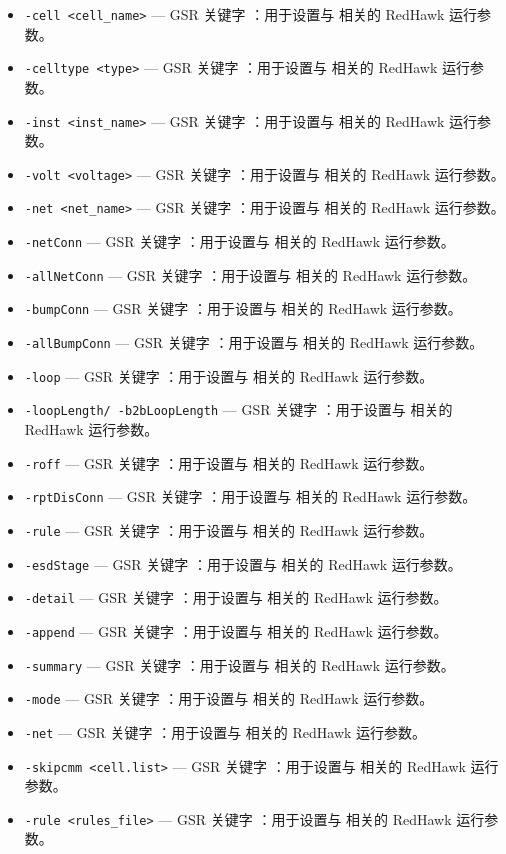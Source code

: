 \begin{itemize}
\item \texttt{-cell <cell\_name>} — GSR 关键字 ：用于设置与  相关的 RedHawk 运行参数。
\item \texttt{-celltype <type>} — GSR 关键字 ：用于设置与  相关的 RedHawk 运行参数。
\item \texttt{-inst <inst\_name>} — GSR 关键字 ：用于设置与  相关的 RedHawk 运行参数。
\item \texttt{-volt <voltage>} — GSR 关键字 ：用于设置与  相关的 RedHawk 运行参数。
\item \texttt{-net <net\_name>} — GSR 关键字 ：用于设置与  相关的 RedHawk 运行参数。
\item \texttt{-netConn} — GSR 关键字 ：用于设置与  相关的 RedHawk 运行参数。
\item \texttt{-allNetConn} — GSR 关键字 ：用于设置与  相关的 RedHawk 运行参数。
\item \texttt{-bumpConn} — GSR 关键字 ：用于设置与  相关的 RedHawk 运行参数。
\item \texttt{-allBumpConn} — GSR 关键字 ：用于设置与  相关的 RedHawk 运行参数。
\item \texttt{-loop} — GSR 关键字 ：用于设置与  相关的 RedHawk 运行参数。
\item \texttt{-loopLength/ -b2bLoopLength} — GSR 关键字 ：用于设置与  相关的 RedHawk 运行参数。
\item \texttt{-roff} — GSR 关键字 ：用于设置与  相关的 RedHawk 运行参数。
\item \texttt{-rptDisConn} — GSR 关键字 ：用于设置与  相关的 RedHawk 运行参数。
\item \texttt{-rule} — GSR 关键字 ：用于设置与  相关的 RedHawk 运行参数。
\item \texttt{-esdStage} — GSR 关键字 ：用于设置与  相关的 RedHawk 运行参数。
\item \texttt{-detail} — GSR 关键字 ：用于设置与  相关的 RedHawk 运行参数。
\item \texttt{-append} — GSR 关键字 ：用于设置与  相关的 RedHawk 运行参数。
\item \texttt{-summary} — GSR 关键字 ：用于设置与  相关的 RedHawk 运行参数。
\item \texttt{-mode} — GSR 关键字 ：用于设置与  相关的 RedHawk 运行参数。
\item \texttt{-net} — GSR 关键字 ：用于设置与  相关的 RedHawk 运行参数。
\item \texttt{-skipcmm <cell.list>} — GSR 关键字 ：用于设置与  相关的 RedHawk 运行参数。
\item \texttt{-rule <rules\_file>} — GSR 关键字 ：用于设置与  相关的 RedHawk 运行参数。

\end{itemize}
